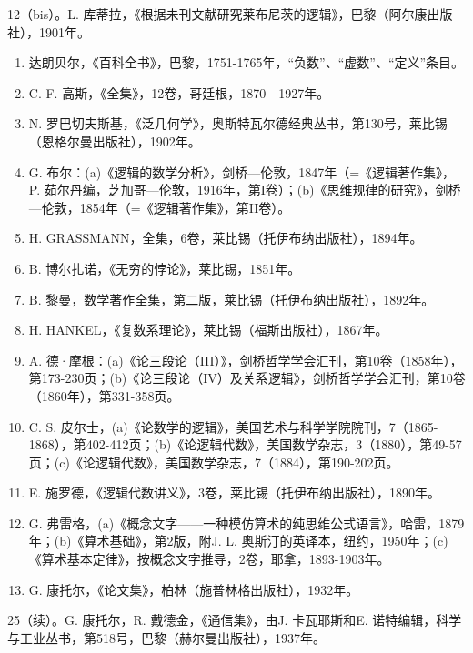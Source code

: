 12（bis）。L. 库蒂拉，《根据未刊文献研究莱布尼茨的逻辑》，巴黎（阿尔康出版社），1901年。

\begin{enumerate}
\def\labelenumi{\arabic{enumi}.}
\setcounter{enumi}{12}
\item
  达朗贝尔，《百科全书》，巴黎，1751-1765年，“负数”、“虚数”、“定义”条目。
\item
  C. F. 高斯，《全集》，12卷，哥廷根，1870—1927年。
\item
  N. 罗巴切夫斯基，《泛几何学》，奥斯特瓦尔德经典丛书，第130号，莱比锡（恩格尔曼出版社），1902年。
\item
  G. 布尔：(a)《逻辑的数学分析》，剑桥—伦敦，1847年（=《逻辑著作集》，P. 茹尔丹编，芝加哥—伦敦，1916年，第I卷）；(b)《思维规律的研究》，剑桥—伦敦，1854年（=《逻辑著作集》，第II卷）。
\item
  H. GRASSMANN，全集，6卷，莱比锡（托伊布纳出版社），1894年。
\item
  B. 博尔扎诺，《无穷的悖论》，莱比锡，1851年。
\item
  B. 黎曼，数学著作全集，第二版，莱比锡（托伊布纳出版社），1892年。
\item
  H. HANKEL，《复数系理论》，莱比锡（福斯出版社），1867年。
\item
  A. 德·摩根：(a)《论三段论（III）》，剑桥哲学学会汇刊，第10卷（1858年），第173-230页；(b)《论三段论（IV）及关系逻辑》，剑桥哲学学会汇刊，第10卷（1860年），第331-358页。
\item
  C. S. 皮尔士，(a)《论数学的逻辑》，美国艺术与科学学院院刊，7（1865-1868），第402-412页；(b)《论逻辑代数》，美国数学杂志，3（1880），第49-57页；(c)《论逻辑代数》，美国数学杂志，7（1884），第190-202页。
\item
  E. 施罗德，《逻辑代数讲义》，3卷，莱比锡（托伊布纳出版社），1890年。
\item
  G. 弗雷格，(a)《概念文字——一种模仿算术的纯思维公式语言》，哈雷，1879年；(b)《算术基础》，第2版，附J. L. 奥斯汀的英译本，纽约，1950年；(c)《算术基本定律》，按概念文字推导，2卷，耶拿，1893-1903年。
\item
  G. 康托尔，《论文集》，柏林（施普林格出版社），1932年。
\end{enumerate}

25（续）。G. 康托尔，R. 戴德金，《通信集》，由J. 卡瓦耶斯和E. 诺特编辑，科学与工业丛书，第518号，巴黎（赫尔曼出版社），1937年。

